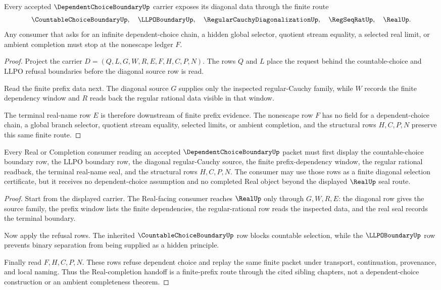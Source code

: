 \begin{theorem}
\label{thm:dependent-choice-boundary-finite-prefix-nonescape}
Every accepted $\DependentChoiceBoundaryUp$ carrier exposes its diagonal data through the finite route
$$
\CountableChoiceBoundaryUp,\quad
\LLPOBoundaryUp,\quad
\RegularCauchyDiagonalizationUp,\quad
\RegSeqRatUp,\quad
\RealUp .
$$
Any consumer that asks for an infinite dependent-choice chain, a hidden global selector, quotient stream equality, a selected real limit, or ambient completion must stop at the nonescape ledger $F$.
\end{theorem}
\begin{proof}
Project the carrier $D=(Q,L,G,W,R,E,F,H,C,P,N)$. The rows $Q$ and $L$ place the request behind the countable-choice and LLPO refusal boundaries before the diagonal source row is read.

Read the finite prefix data next. The diagonal source $G$ supplies only the inspected regular-Cauchy family, while $W$ records the finite dependency window and $R$ reads back the regular rational data visible in that window.

The terminal real-name row $E$ is therefore downstream of finite prefix evidence. The nonescape row $F$ has no field for a dependent-choice chain, a global branch selector, quotient stream equality, selected limits, or ambient completion, and the structural rows $H,C,P,N$ preserve this same finite route.
\end{proof}

\begin{theorem}
\label{thm:dependent-choice-boundary-real-completion-refusal}
Every Real or Completion consumer reading an accepted $\DependentChoiceBoundaryUp$ packet must first display the countable-choice boundary row, the LLPO boundary row, the diagonal regular-Cauchy source, the finite prefix-dependency window, the regular rational readback, the terminal real-name seal, and the structural rows $H,C,P,N$. The consumer may use those rows as a finite diagonal selection certificate, but it receives no dependent-choice assumption and no completed Real object beyond the displayed $\RealUp$ seal route.
\end{theorem}
\begin{proof}
Start from the displayed carrier. The Real-facing consumer reaches $\RealUp$ only through $G,W,R,E$: the diagonal row gives the source family, the prefix window lists the finite dependencies, the regular-rational row reads the inspected data, and the real seal records the terminal boundary.

Now apply the refusal rows. The inherited $\CountableChoiceBoundaryUp$ row blocks countable selection, while the $\LLPOBoundaryUp$ row prevents binary separation from being supplied as a hidden principle.

Finally read $F,H,C,P,N$. These rows refuse dependent choice and replay the same finite packet under transport, continuation, provenance, and local naming. Thus the Real-completion handoff is a finite-prefix route through the cited sibling chapters, not a dependent-choice construction or an ambient completeness theorem.
\end{proof}

